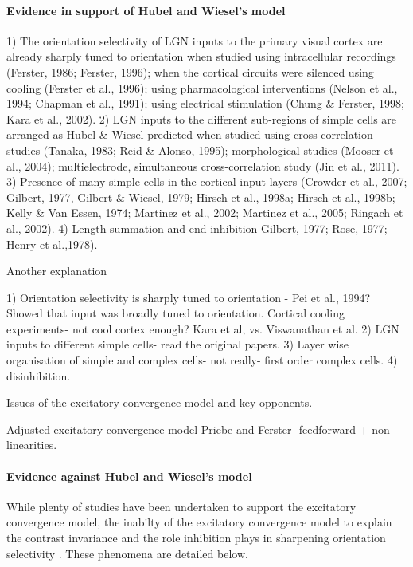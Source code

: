 \paragraph{Evidence in support of Hubel and Wiesel's model}
1) The orientation selectivity of LGN inputs to the primary visual cortex are already sharply tuned to orientation when studied using intracellular recordings (Ferster, 1986; Ferster, 1996); when the cortical circuits were silenced using cooling (Ferster et al., 1996); using pharmacological interventions (Nelson et al., 1994; Chapman et al., 1991); using electrical stimulation (Chung \& Ferster, 1998; Kara et al., 2002).
2) LGN inputs to the different sub-regions of simple cells are arranged as Hubel \& Wiesel predicted when studied using cross-correlation studies (Tanaka, 1983; Reid \& Alonso, 1995); morphological studies (Mooser et al., 2004); multielectrode, simultaneous cross-correlation study (Jin et al., 2011).
3) Presence of many simple cells in the cortical input layers (Crowder et al., 2007; Gilbert, 1977, Gilbert \& Wiesel, 1979; Hirsch et al., 1998a; Hirsch et al., 1998b; Kelly \& Van Essen, 1974; Martinez et al., 2002; Martinez et al., 2005; Ringach et al., 2002).
4) Length summation and end inhibition Gilbert, 1977; Rose, 1977; Henry et al.,1978).

Another explanation

1) Orientation selectivity is sharply tuned to orientation - Pei et al., 1994? Showed that input was broadly tuned to orientation. Cortical cooling experiments- not cool cortex enough? Kara et al, vs. Viswanathan et al.
2) LGN inputs to different simple cells- read the original papers.
3) Layer wise organisation of simple and complex cells- not really- first order complex cells.
4) disinhibition.

Issues of the excitatory convergence model and key opponents.

Adjusted excitatory convergence model
Priebe and Ferster- feedforward + non-linearities.

\paragraph{Evidence against Hubel and Wiesel's model}

While plenty of studies have been undertaken to support the excitatory convergence model, the inabilty of the excitatory convergence model to explain the contrast invariance \cite{Sclar1982} and the role inhibition plays in sharpening orientation selectivity \cite{Creutzfeldt1974, Sillito1975}. These phenomena are detailed below.
 
